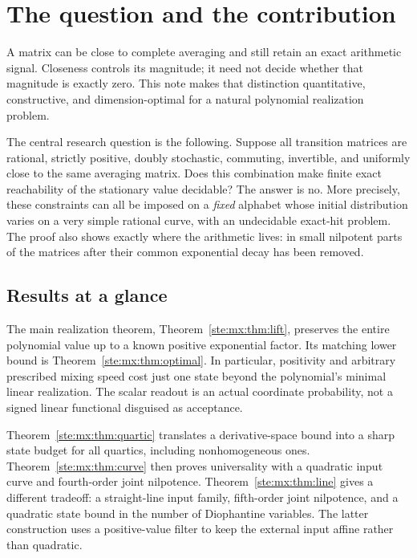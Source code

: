 \documentclass[11pt,letterpaper]{article}
\theoremstyle{definition}
\theoremstyle{remark}
\begin{document}
\section{The question and the contribution}\label{ste:mx:sec:intro}

A matrix can be close to complete averaging and still retain an exact arithmetic
signal. Closeness controls its magnitude; it need not decide whether that
magnitude is exactly zero. This note makes that distinction quantitative,
constructive, and dimension-optimal for a natural polynomial realization
problem.

The central research question is the following. Suppose all transition matrices
are rational, strictly positive, doubly stochastic, commuting, invertible, and
uniformly close to the same averaging matrix. Does this combination make finite
exact reachability of the stationary value decidable? The answer is no. More
precisely, these constraints can all be imposed on a \emph{fixed} alphabet whose
initial distribution varies on a very simple rational curve, with an
undecidable exact-hit problem. The proof also shows exactly where the arithmetic
lives: in small nilpotent parts of the matrices after their common exponential
decay has been removed.

\subsection{Results at a glance}

The main realization theorem, Theorem~\ref{ste:mx:thm:lift}, preserves the entire
polynomial value up to a known positive exponential factor. Its matching lower
bound is Theorem~\ref{ste:mx:thm:optimal}. In particular, positivity and arbitrary
prescribed mixing speed cost just one state beyond the polynomial's minimal
linear realization. The scalar readout is an actual coordinate probability,
not a signed linear functional disguised as acceptance.

Theorem~\ref{ste:mx:thm:quartic} translates a derivative-space bound into a sharp state
budget for all quartics, including nonhomogeneous ones. Theorem~\ref{ste:mx:thm:curve}
then proves universality with a quadratic input curve and fourth-order joint
nilpotence. Theorem~\ref{ste:mx:thm:line} gives a different tradeoff: a straight-line
input family, fifth-order joint nilpotence, and a quadratic state bound in the
number of Diophantine variables. The latter construction uses a positive-value
filter to keep the external input affine rather than quadratic.
\end{document}
